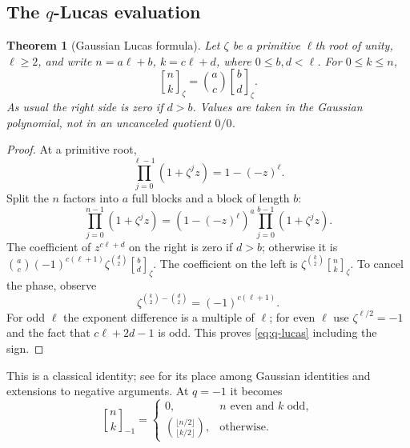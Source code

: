 \documentclass[11pt,a4paper]{article}
\numberwithin{equation}{section}
\newtheorem{theorem}{Theorem}[section]
\theoremstyle{definition}
\theoremstyle{remark}
\newcommand{\Gb}[3]{\genfrac{[}{]}{0pt}{}{#1}{#2}_{#3}}
\begin{document}
\subsection{The \texorpdfstring{$q$}{q}-Lucas evaluation}
\begin{theorem}[Gaussian Lucas formula]
Let $\zeta$ be a primitive $\ell$th root of unity, $\ell\ge2$, and write
$n=a\ell+b$, $k=c\ell+d$, where $0\le b,d<\ell$. For $0\le k\le n$,
\begin{equation}
 \boxed{\displaystyle
 \Gb nk\zeta=\binom ac\Gb bd\zeta.}
 \label{eq:q-lucas}
\end{equation}
As usual the right side is zero if $d>b$. Values are taken in the
Gaussian polynomial, not in an uncanceled quotient $0/0$.
\end{theorem}
\begin{proof}
At a primitive root,
\[
 \prod_{j=0}^{\ell-1}(1+\zeta^jz)=1-(-z)^\ell.
\]
Split the $n$ factors into $a$ full blocks and a block of length $b$:
\[
 \prod_{j=0}^{n-1}(1+\zeta^jz)
  =(1-(-z)^\ell)^a\prod_{j=0}^{b-1}(1+\zeta^jz).
\]
The coefficient of $z^{c\ell+d}$ on the right is zero if $d>b$;
otherwise it is
$\binom ac(-1)^{c(\ell+1)}\zeta^{\binom d2}\Gb bd\zeta$.
The coefficient on the left is
$\zeta^{\binom k2}\Gb nk\zeta$. To cancel the phase, observe
\[
 \zeta^{\binom k2-\binom d2}=(-1)^{c(\ell+1)}.
\]
For odd $\ell$ the exponent difference is a multiple of $\ell$; for
even $\ell$ use $\zeta^{\ell/2}=-1$ and the fact that $c\ell+2d-1$
is odd. This proves \cref{eq:q-lucas} including the sign.
\end{proof}
This is a classical identity; see \cite{formichella} for its place
among Gaussian identities and extensions to negative arguments.
At $q=-1$ it becomes
\begin{equation}
 \Gb nk{-1}=
 \begin{cases}
  0,&n\text{ even and }k\text{ odd},\\
  \displaystyle\binom{\lfloor n/2\rfloor}{\lfloor k/2\rfloor},
       &\text{otherwise}.
 \end{cases}
 \label{eq:q-minus-one}
\end{equation}
\end{document}
